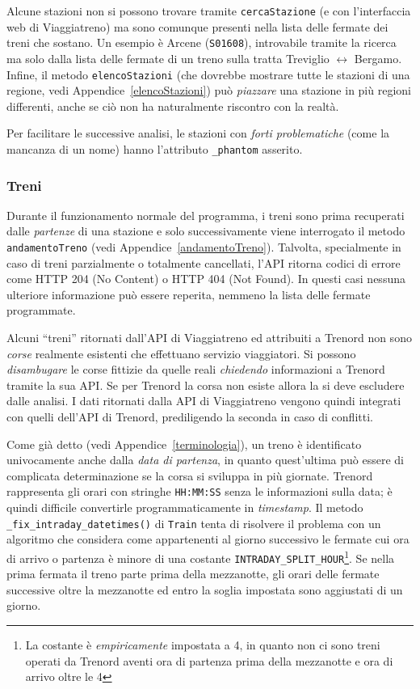 \documentclass[12pt,italian]{report}
\begin{document}
Alcune stazioni non si possono trovare tramite \texttt{cercaStazione}
(e con l'interfaccia web di Viaggiatreno) ma sono comunque presenti
nella lista delle fermate dei treni che sostano.  Un esempio è Arcene
(\texttt{S01608}), introvabile tramite la ricerca ma solo dalla lista
delle fermate di un treno sulla tratta Treviglio $\leftrightarrow$
Bergamo.  Infine, il metodo \texttt{elencoStazioni} (che dovrebbe
mostrare tutte le stazioni di una regione, vedi
Appendice~\ref{elencoStazioni}) può \textit{piazzare} una stazione in
più regioni differenti, anche se ciò non ha naturalmente riscontro con
la realtà.

Per facilitare le successive analisi, le stazioni con \textit{forti
    problematiche} (come la mancanza di un nome) hanno l'attributo
\texttt{\_phantom} asserito.

\subsubsection{Treni}

Durante il funzionamento normale del programma, i treni sono prima
recuperati dalle \textit{partenze} di una stazione e solo
successivamente viene interrogato il metodo \texttt{andamentoTreno}
(vedi Appendice~\ref{andamentoTreno}).  Talvolta, specialmente in caso
di treni parzialmente o totalmente cancellati, l'API ritorna codici di
errore come HTTP 204 (No Content) o HTTP 404 (Not Found).  In questi
casi nessuna ulteriore informazione può essere reperita, nemmeno la
lista delle fermate programmate.

Alcuni ``treni'' ritornati dall'API di Viaggiatreno ed attribuiti a
Trenord non sono \textit{corse} realmente esistenti che effettuano
servizio viaggiatori.  Si possono \textit{disambugare} le corse
fittizie da quelle reali \textit{chiedendo} informazioni a Trenord
tramite la sua API\@.  Se per Trenord la corsa non esiste allora la si
deve escludere dalle analisi.  I dati ritornati dalla API di
Viaggiatreno vengono quindi integrati con quelli dell'API di Trenord,
prediligendo la seconda in caso di conflitti.

Come già detto (vedi Appendice~\ref{terminologia}), un treno è
identificato univocamente anche dalla \textit{data di partenza}, in
quanto quest'ultima può essere di complicata determinazione se la
corsa si sviluppa in più giornate.  Trenord rappresenta gli orari con
stringhe \texttt{HH:MM:SS} senza le informazioni sulla data; è quindi
difficile convertirle programmaticamente in \textit{timestamp}.  Il
metodo \texttt{\_fix\_intraday\_datetimes()} di \texttt{Train} tenta
di risolvere il problema con un algoritmo che considera come
appartenenti al giorno successivo le fermate cui ora di arrivo o
partenza è minore di una costante
\texttt{INTRADAY\_\-SPLIT\_\-HOUR}\footnote{La costante è
    \textit{empiricamente} impostata a 4, in quanto non ci sono treni
    operati da Trenord aventi ora di partenza prima della mezzanotte e
    ora di arrivo oltre le 4}.  Se nella prima fermata il treno parte
prima della mezzanotte, gli orari delle fermate successive oltre la
mezzanotte ed entro la soglia impostata sono aggiustati di un giorno.
\end{document}
